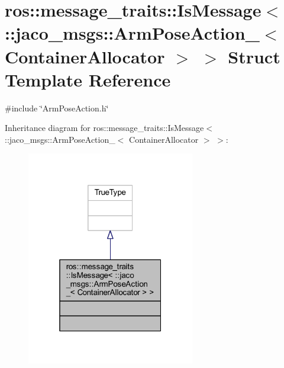 \hypertarget{structros_1_1message__traits_1_1IsMessage_3_01_1_1jaco__msgs_1_1ArmPoseAction___3_01ContainerAllocator_01_4_01_4}{}\section{ros\+:\+:message\+\_\+traits\+:\+:Is\+Message$<$ \+:\+:jaco\+\_\+msgs\+:\+:Arm\+Pose\+Action\+\_\+$<$ Container\+Allocator $>$ $>$ Struct Template Reference}
\label{structros_1_1message__traits_1_1IsMessage_3_01_1_1jaco__msgs_1_1ArmPoseAction___3_01ContainerAllocator_01_4_01_4}


{\ttfamily \#include \char`\"{}Arm\+Pose\+Action.\+h\char`\"{}}



Inheritance diagram for ros\+:\+:message\+\_\+traits\+:\+:Is\+Message$<$ \+:\+:jaco\+\_\+msgs\+:\+:Arm\+Pose\+Action\+\_\+$<$ Container\+Allocator $>$ $>$\+:
\nopagebreak
\begin{figure}[H]
\begin{center}
\leavevmode
\includegraphics[width=208pt]{d7/d66/structros_1_1message__traits_1_1IsMessage_3_01_1_1jaco__msgs_1_1ArmPoseAction___3_01ContainerAll05210139048b7b002439834dd0cc8c35}
\end{center}
\end{figure}


